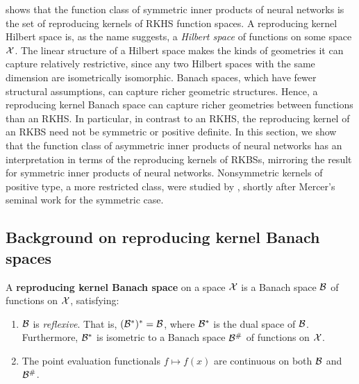  shows that the function class of symmetric inner products of neural networks is the set of reproducing kernels of RKHS function spaces. A reproducing kernel Hilbert space is, as the name suggests, a \textit{Hilbert space} of functions on some space ${\mathcal{X}}$. The linear structure of a Hilbert space makes the kinds of geometries it can capture relatively restrictive, since any two Hilbert spaces with the same dimension are isometrically isomorphic. Banach spaces, which have fewer structural assumptions, can capture richer geometric structures. Hence, a reproducing kernel Banach space can capture richer geometries between functions than an RKHS. In particular, in contrast to an RKHS, the reproducing kernel of an RKBS need not be symmetric or positive definite. In this section, we show that the function class of asymmetric inner products of neural networks has an interpretation in terms of the reproducing kernels of RKBSs, mirroring the result for symmetric inner products of neural networks. Nonsymmetric kernels of positive type, a more restricted class, were studied by \citet{seelyNonSymmetricKernels1919}, shortly after Mercer's seminal work for the symmetric case. %

\subsection{Background on reproducing kernel Banach spaces}

\begin{definition}
    A \textbf{reproducing kernel Banach space} on a space ${\mathcal{X}}$ is a Banach space ${\mathcal{B}}$ of functions on ${\mathcal{X}}$, satisfying:
    \begin{enumerate}
        \item ${\mathcal{B}}$ is \textit{reflexive}. That is, $({\mathcal{B}}^*)^* = {\mathcal{B}}$, where ${\mathcal{B}}^*$ is the dual space of ${\mathcal{B}}$. Furthermore, ${\mathcal{B}}^*$ is isometric to a Banach space ${\mathcal{B}}^\#$ of functions on ${\mathcal{X}}$.
        \item The point evaluation functionals $f \mapsto f(x)$ are continuous on both ${\mathcal{B}}$ and ${\mathcal{B}}^\#$.
    \end{enumerate}
\end{definition}

